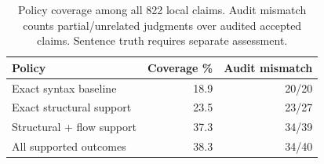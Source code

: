 \begin{table}[t]\centering\caption{Policy coverage among all 822 local claims. Audit mismatch counts partial/unrelated judgments over audited accepted claims. Sentence truth requires separate assessment.}\label{tab:risk}\footnotesize\begin{tabular}{@{}lrr@{}}\toprule Policy & Coverage \% & Audit mismatch \\\midrule
Exact syntax baseline & 18.9 & 20/20 \\
Exact structural support & 23.5 & 23/27 \\
Structural + flow support & 37.3 & 34/39 \\
All supported outcomes & 38.3 & 34/40 \\\bottomrule\end{tabular}\end{table}
